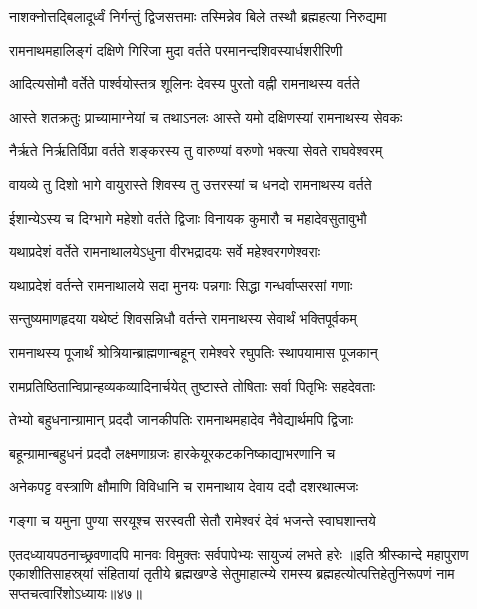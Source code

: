 \twolineshloka
{नाशक्नोत्तद्बिलादूर्ध्वं निर्गन्तुं द्विजसत्तमाः}
{तस्मिन्नेव बिले तस्थौ ब्रह्महत्या निरुद्यमा}%

\twolineshloka
{रामनाथमहालिङ्गं दक्षिणे गिरिजा मुदा}
{वर्तते परमानन्दशिवस्यार्धशरीरिणी}%

\twolineshloka
{आदित्यसोमौ वर्तेते पार्श्वयोस्तत्र शूलिनः}
{देवस्य पुरतो वह्नी रामनाथस्य वर्तते}%

\twolineshloka
{आस्ते शतक्रतुः प्राच्यामाग्नेयां च तथाऽनलः}
{आस्ते यमो दक्षिणस्यां रामनाथस्य सेवकः}%

\twolineshloka
{नैर्ऋते निर्ऋतिर्विप्रा वर्तते शङ्करस्य तु}
{वारुण्यां वरुणो भक्त्या सेवते राघवेश्वरम्}%

\twolineshloka
{वायव्ये तु दिशो भागे वायुरास्ते शिवस्य तु}
{उत्तरस्यां च धनदो रामनाथस्य वर्तते}%

\twolineshloka
{ईशान्येऽस्य च दिग्भागे महेशो वर्तते द्विजाः}
{विनायक कुमारौ च महादेवसुतावुभौ}%

\twolineshloka
{यथाप्रदेशं वर्तेते रामनाथालयेऽधुना}
{वीरभद्रादयः सर्वे महेश्वरगणेश्वराः}%

\twolineshloka
{यथाप्रदेशं वर्तन्ते रामनाथालये सदा}
{मुनयः पन्नगाः सिद्धा गन्धर्वाप्सरसां गणाः}%

\twolineshloka
{सन्तुष्यमाणहृदया यथेष्टं शिवसन्निधौ}
{वर्तन्ते रामनाथस्य सेवार्थं भक्तिपूर्वकम्}%

\twolineshloka
{रामनाथस्य पूजार्थं श्रोत्रियान्ब्राह्मणान्बहून्}
{रामेश्वरे रघुपतिः स्थापयामास पूजकान्}%

\twolineshloka
{रामप्रतिष्ठितान्विप्रान्हव्यकव्यादिनार्चयेत्}
{तुष्टास्ते तोषिताः सर्वा पितृभिः सहदेवताः}%

\twolineshloka
{तेभ्यो बहुधनान्ग्रामान् प्रददौ जानकीपतिः}
{रामनाथमहादेव नैवेद्यार्थमपि द्विजाः}%

\twolineshloka
{बहून्ग्रामान्बहुधनं प्रददौ लक्ष्मणाग्रजः}
{हारकेयूरकटकनिष्काद्याभरणानि च}%

\twolineshloka
{अनेकपट्ट वस्त्राणि क्षौमाणि विविधानि च}
{रामनाथाय देवाय ददौ दशरथात्मजः}%

\twolineshloka
{गङ्गा च यमुना पुण्या सरयूश्च सरस्वती}
{सेतौ रामेश्वरं देवं भजन्ते स्वाघशान्तये}%

\twolineshloka
{एतदध्यायपठनाच्छ्रवणादपि मानवः}
{विमुक्तः सर्वपापेभ्यः सायुज्यं लभते हरेः}%
॥इति श्रीस्कान्दे महापुराण एकाशीतिसाहस्र्यां संहितायां तृतीये ब्रह्मखण्डे सेतुमाहात्म्ये रामस्य ब्रह्महत्योत्पत्तिहेतुनिरूपणं नाम सप्तचत्वारिंशोऽध्यायः॥४७॥